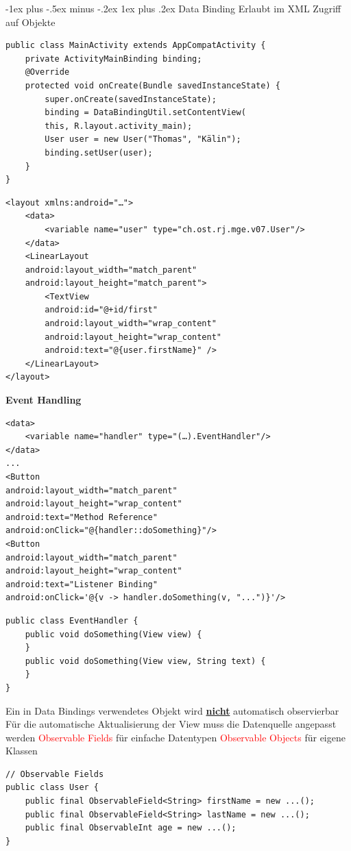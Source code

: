\documentclass[10pt,landscape,a4paper]{article}
\makeatletter
\renewcommand{\subsubsection}{\@startsection{subsubsection}{3}{0mm}%
                                {-1ex plus -.5ex minus -.2ex}%
                                {1ex plus .2ex}%
                                {\normalfont\footnotesize\bfseries}}
\makeatother
\begin{document}
\begin{multicols*}{3}
\subsubsection{Data Binding}
Erlaubt im XML Zugriff auf Objekte
\begin{verbatim}
public class MainActivity extends AppCompatActivity {
    private ActivityMainBinding binding;
    @Override
    protected void onCreate(Bundle savedInstanceState) {
        super.onCreate(savedInstanceState);
        binding = DataBindingUtil.setContentView(
        this, R.layout.activity_main);
        User user = new User("Thomas", "Kälin");
        binding.setUser(user);
    }
}
\end{verbatim}
\begin{verbatim}
<layout xmlns:android="…">
    <data>
        <variable name="user" type="ch.ost.rj.mge.v07.User"/>
    </data>
    <LinearLayout
    android:layout_width="match_parent"
    android:layout_height="match_parent">
        <TextView
        android:id="@+id/first"
        android:layout_width="wrap_content"
        android:layout_height="wrap_content"
        android:text="@{user.firstName}" />
    </LinearLayout>
</layout>
\end{verbatim}
\textbf{Event Handling}
\begin{verbatim}
<data>
    <variable name="handler" type="(…).EventHandler"/>
</data>
...
<Button
android:layout_width="match_parent"
android:layout_height="wrap_content"
android:text="Method Reference"
android:onClick="@{handler::doSomething}"/>
<Button
android:layout_width="match_parent"
android:layout_height="wrap_content"
android:text="Listener Binding"
android:onClick='@{v -> handler.doSomething(v, "...")}'/>
\end{verbatim}
\begin{verbatim}
public class EventHandler {
    public void doSomething(View view) {
    }
    public void doSomething(View view, String text) {
    }
}
\end{verbatim}
Ein in Data Bindings verwendetes Objekt
wird \underline{\textbf{nicht}} automatisch observierbar\\
Für die automatische Aktualisierung der View
muss die Datenquelle angepasst werden
\textcolor{red}{Observable Fields} für einfache Datentypen
\textcolor{red}{Observable Objects} für eigene Klassen

\begin{verbatim}
// Observable Fields
public class User {
    public final ObservableField<String> firstName = new ...();
    public final ObservableField<String> lastName = new ...();
    public final ObservableInt age = new ...();
}


\end{verbatim}
\end{multicols*}
\end{document}
